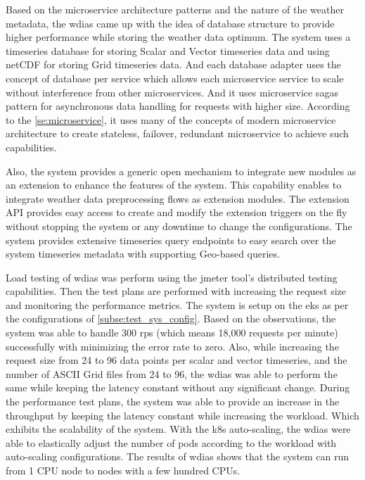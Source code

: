 Based on the microservice architecture patterns and the nature of the weather metadata, the \acrshort{wdias} came up with the idea of database structure to provide higher performance while storing the weather data optimum. The system uses a timeseries database for storing Scalar and Vector timeseries data and using \acrshort{netCDF} for storing Grid timeseries data. And each database adapter uses the concept of database per service which allows each microservice service to scale without interference from other microservices.
And it uses microservice sagas pattern for asynchronous data handling for requests with higher size. According to the \cref{se:microservice}, it uses many of the concepts of modern microservice architecture to create stateless, failover, redundant microservice to achieve such capabilities.

Also, the system provides a generic open mechanism to integrate new modules as an extension to enhance the features of the system. This capability enables to integrate weather data preprocessing flows as extension modules.
The extension API provides easy access to create and modify the extension triggers on the fly without stopping the system or any downtime to change the configurations.
The system provides extensive timeseries query endpoints to easy search over the system timeseries metadata with supporting Geo-based queries.

Load testing of \acrshort{wdias} was perform using the \acrshort{jmeter} tool's distributed testing capabilities. Then the test plans are performed with increasing the request size and monitoring the performance metrics. The system is setup on the \acrfull{eks} as per the configurations of \cref{subse:test_sys_config}. Based on the observations, the system was able to handle 300 \acrshort{rps} (which means 18,000 requests per minute) successfully with minimizing the error rate to zero. Also, while increasing the request size from 24 to 96 data points per scalar and vector timeseries, and the number of ASCII Grid files from 24 to 96, the \acrshort{wdias} was able to perform the same while keeping the latency constant without any significant change. During the performance test plans, the system was able to provide an increase in the throughput by keeping the latency constant while increasing the workload. Which exhibits the scalability of the system.
With the \acrshort{k8s} auto-scaling, the \acrshort{wdias} were able to elastically adjust the number of pods according to the workload with auto-scaling configurations. 
The results of \acrshort{wdias} shows that the system can run from 1 CPU node to nodes with a few hundred CPUs.